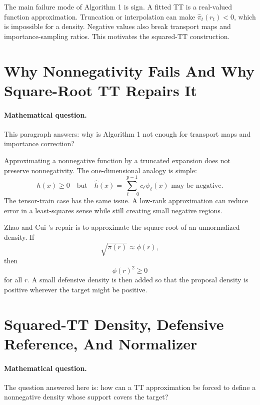 \documentclass[11pt]{article}
\numberwithin{equation}{section}
\begin{document}
The main failure mode of Algorithm 1 is sign.  A fitted TT is a real-valued
function approximation.  Truncation or interpolation can make
\(\widehat\pi_t(r_t)<0\), which is impossible for a density.  Negative values
also break transport maps and importance-sampling ratios.  This motivates the
squared-TT construction.

\section{Why Nonnegativity Fails And Why Square-Root TT Repairs It}

\paragraph{Mathematical question.}
This paragraph answers: why is Algorithm 1 not enough for transport maps and
importance correction?

Approximating a nonnegative function by a truncated expansion does not preserve
nonnegativity.  The one-dimensional analogy is simple:
\[
    h(x)\ge 0
    \quad\text{but}\quad
    \widehat h(x)=\sum_{\ell=0}^{p-1}c_\ell\psi_\ell(x)
    \text{ may be negative.}
\]
The tensor-train case has the same issue.  A low-rank approximation can reduce
error in a least-squares sense while still creating small negative regions.

Zhao and Cui \cite{zhao2024ttsequential}'s repair is to approximate the square root of an unnormalized density.
If
\[
    \sqrt{\pi(r)}\approx \phi(r),
\]
then
\[
    \phi(r)^2\ge 0
\]
for all \(r\).  A small defensive density is then added so that the proposal
density is positive wherever the target might be positive.

\section{Squared-TT Density, Defensive Reference, And Normalizer}

\paragraph{Mathematical question.}
The question answered here is: how can a TT approximation be forced to define a
nonnegative density whose support covers the target?
\end{document}
